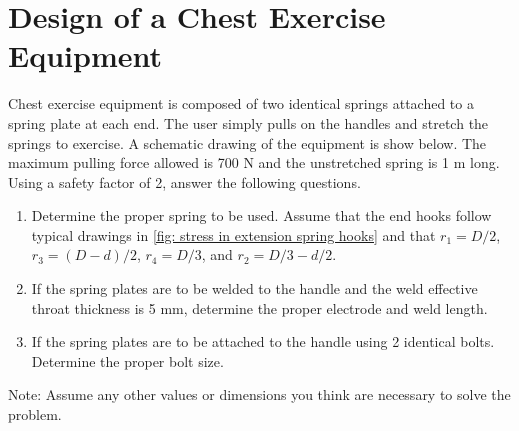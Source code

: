 \documentclass[
10pt,
a4paper,
openany,
svgnames,
]{book}
\begin{document}
\section{Design of a Chest Exercise Equipment}

Chest exercise equipment is composed of two identical springs attached to a spring plate at each end. The user simply pulls on the handles and stretch the springs to exercise. A schematic drawing of the equipment is show below. The maximum pulling force allowed is 700 N and the unstretched spring is 1 m long. Using a safety factor of 2, answer the following questions.

  \begin{figure}[h]
    \centering
  \end{figure}

\begin{enumerate}
\item Determine the proper spring to be used. Assume that the end hooks follow typical drawings in \cref{fig: stress in extension spring hooks} and that $r_1 = D / 2$, $r_3 = (D - d) / 2$, $r_4 = D / 3$, and $r_2 = D / 3 - d / 2$.
\item If the spring plates are to be welded to the handle and the weld effective throat thickness is 5 mm, determine the proper electrode and weld length.
\item If the spring plates are to be attached to the handle using 2 identical bolts. Determine the proper bolt size.
\end{enumerate}
Note: Assume any other values or dimensions you think are necessary to solve the problem.
\end{document}
